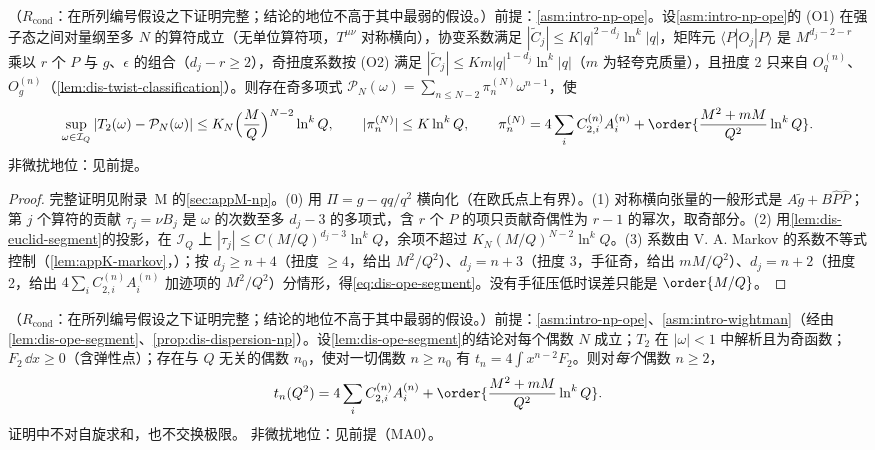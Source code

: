 \begin{lemma}\label{lem:dis-ope-segment}
（$R_{\mathrm{cond}}$：在所列编号假设之下证明完整；结论的地位不高于其中最弱的假设。）前提：\cref{asm:intro-np-ope}。设\cref{asm:intro-np-ope}的 (O1) 在强子态之间对量纲至多 $N$ 的算符成立（无单位算符项，$T^{\mu\nu}$ 对称横向），协变系数满足 $|\tilde C_j|\le K|q|^{2-d_j}\ln^k|q|$，矩阵元 $\langle P|O_j|P\rangle$ 是 $M^{d_j-2-r}$ 乘以 $r$ 个 $P$ 与 $g$、$\epsilon$ 的组合（$d_j-r\ge2$），奇扭度系数按 (O2) 满足 $|\tilde C_j|\le Km|q|^{1-d_j}\ln^k|q|$（$m$ 为轻夸克质量），且扭度 2 只来自 $O^{(n)}_q$、$O^{(n)}_g$（\cref{lem:dis-twist-classification}）。则存在奇多项式 $\mathcal P_N(\omega)=\sum_{n\le N-2}\pi^{(N)}_n\omega^{n-1}$，使
\begin{equation}\label{eq:dis-ope-segment}
\sup_{\omega\in\mathcal I_Q}|T_2(\omega)-\mathcal P_N(\omega)|\le K_N\Big(\frac MQ\Big)^{N-2}\ln^kQ,\qquad |\pi^{(N)}_n|\le K\ln^kQ,\qquad \pi^{(N)}_n=4\sum_iC^{(n)}_{2,i}A^{(n)}_i+\order{\frac{M^2+mM}{Q^2}\ln^kQ}.
\end{equation}
非微扰地位：见前提。
\end{lemma}

\begin{proof}
完整证明见附录~M 的\cref{sec:appM-np}。(0) 用 $\Pi=g-qq/q^2$ 横向化（在欧氏点上有界）。(1) 对称横向张量的一般形式是 $A\tilde g+B\hat P\hat P$；第 $j$ 个算符的贡献 $\tau_j=\nu B_j$ 是 $\omega$ 的次数至多 $d_j-3$ 的多项式，含 $r$ 个 $P$ 的项只贡献奇偶性为 $r-1$ 的幂次，取奇部分。(2) 用\cref{lem:dis-euclid-segment}的投影，在 $\mathcal I_Q$ 上 $|\tau_j|\le C(M/Q)^{d_j-3}\ln^kQ$，余项不超过 $K_N(M/Q)^{N-2}\ln^kQ$。(3) 系数由 V. A. Markov 的系数不等式控制（\cref{lem:appK-markov}，\cite{Markoff1916}）；按 $d_j\ge n+4$（扭度 $\ge4$，给出 $M^2/Q^2$）、$d_j=n+3$（扭度 3，手征奇，给出 $mM/Q^2$）、$d_j=n+2$（扭度 2，给出 $4\sum_iC^{(n)}_{2,i}A^{(n)}_i$ 加迹项的 $M^2/Q^2$）分情形，得\cref{eq:dis-ope-segment}。没有手征压低时误差只能是 $\order{M/Q}$。
\end{proof}

\begin{theorem}\label{thm:dis-fixed-n}
（$R_{\mathrm{cond}}$：在所列编号假设之下证明完整；结论的地位不高于其中最弱的假设。）前提：\cref{asm:intro-np-ope}、\cref{asm:intro-wightman}（经由\cref{lem:dis-ope-segment}、\cref{prop:dis-dispersion-np}）。设\cref{lem:dis-ope-segment}的结论对每个偶数 $N$ 成立；$T_2$ 在 $|\omega|<1$ 中解析且为奇函数；$F_2\,\dd x\ge0$（含弹性点）；存在与 $Q$ 无关的偶数 $n_0$，使对一切偶数 $n\ge n_0$ 有 $t_n=4\int x^{n-2}F_2$。则对\emph{每个}偶数 $n\ge2$，
\begin{equation}\label{eq:dis-fixed-n}
t_n(Q^2)=4\sum_iC^{(n)}_{2,i}A^{(n)}_i+\order{\frac{M^2+mM}{Q^2}\ln^kQ}.
\end{equation}
证明中不对自旋求和，也不交换极限。
非微扰地位：见前提（MA0）。
\end{theorem}

